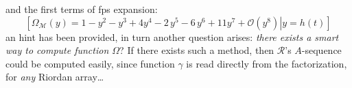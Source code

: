 and the first terms of fps expansion:
\begin{displaymath}
        \left.\left[
            \Omega_{\mathcal{M}}(y) = 1 -y^{2} -y^{3} + 4 y^{4} -2\,y^{5} 
                -6\,y^{6} + 11 y^{7}+\mathcal{O}\left(y^{8}\right)
                \right| y = h(t) \right]
\end{displaymath}
an hint has been provided, in turn another question arises: \emph{there
exists a smart way to compute function $\Omega$}? If there exists such a method, then
$\mathcal{R}$'s $A$-sequence could be computed easily, since function $\gamma$ 
is read directly from the factorization, for \emph{any} Riordan array\ldots
